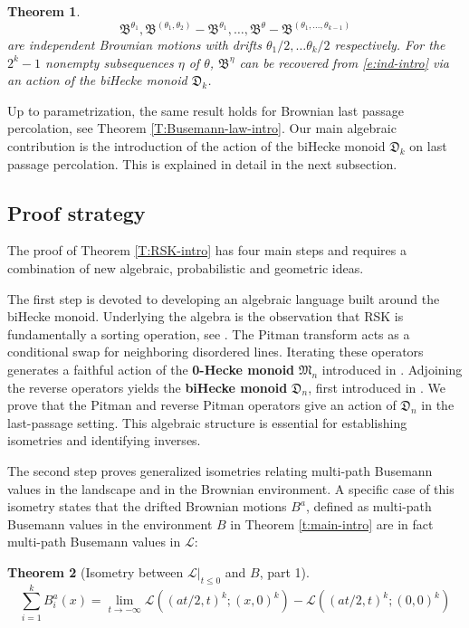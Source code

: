 \documentclass[11pt]{article}
\newcommand{\cL}{\mathcal{L}}
\newtheorem{theorem}{Theorem}[section]
\theoremstyle{definition} %
\theoremstyle{remark} %
\begin{document}
\begin{theorem}
\label{t:bus-intro} 
\begin{equation}
\label{e:ind-intro}
\mathfrak B^{\theta_1}, \mathfrak B^{(\theta_1, \theta_2)}-\mathfrak B^{\theta_1}, \ldots, \mathfrak B^{\theta}-\mathfrak B^{(\theta_1,\ldots,\theta_{k-1})}
\end{equation}
 are independent Brownian motions with drifts $\theta_1/2,\ldots \theta_k/2$ respectively.
For the $2^k-1$ nonempty subsequences $\eta$ of $\theta$, $\mathfrak B^\eta$ can be recovered from \eqref{e:ind-intro} via an action of the biHecke monoid $\mathfrak D_k$.
\end{theorem}


Up to parametrization, the same result holds for Brownian last passage percolation, see Theorem \ref{T:Busemann-law-intro}.
Our main algebraic contribution is the introduction of the action of the biHecke monoid $\mathfrak D_k$ on last passage percolation. This is explained in detail in the next subsection.

\subsection{Proof strategy}
\label{SS:strategy}

The proof of Theorem \ref{T:RSK-intro} has four main steps and requires a combination of new algebraic, probabilistic and geometric ideas.

The first step is devoted to developing an algebraic language built around the biHecke monoid. Underlying the algebra is the observation that RSK is fundamentally a sorting operation, see \cite{biane2005littelmann}. The Pitman transform acts as a conditional swap for neighboring disordered lines. Iterating these operators generates a faithful action of the {\bf 0-Hecke monoid} \(\mathfrak{M}_n\) introduced in \cite{Norton1979}. Adjoining the reverse operators yields the {\bf biHecke monoid} \(\mathfrak{D}_n\), first introduced in \cite{HST13}. We prove that the Pitman and reverse Pitman operators give an action of \(\mathfrak{D}_n\) in the last-passage setting. This algebraic structure is essential for establishing isometries and identifying inverses.

The second step proves generalized isometries relating multi-path Busemann values in the landscape and in the Brownian environment.  A specific case of this isometry states that the drifted Brownian motions $B^a$, defined as multi-path Busemann values in the environment $B$ in Theorem \ref{t:main-intro} are in fact multi-path Busemann values in $\mathcal L$:
\begin{theorem}[Isometry between $\mathcal L|_{t\le 0}$ and $B$, part 1]
\begin{equation}
\sum_{i=1}^k B_i^a(x) = \lim_{t \to -\infty} \cL((at/2,t)^k; (x, 0)^k) - \cL((at/2,t)^k; (0, 0)^k)
\end{equation}
\end{theorem}
\end{document}
